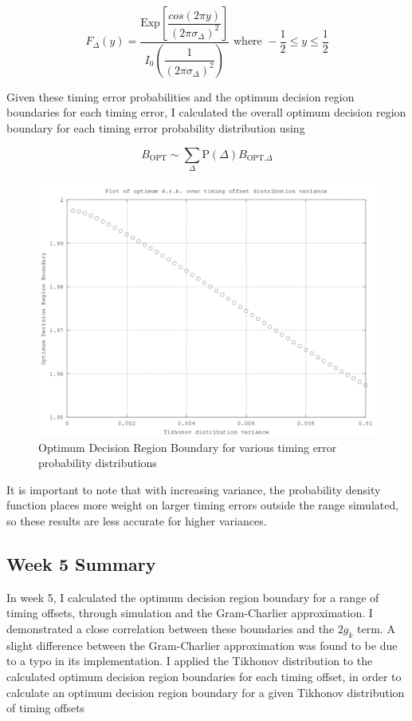 \[
F_{\Delta} (y) = \frac{\text{Exp}\left [ \dfrac{cos(2 \pi y)}{(2 \pi \sigma_{\Delta})^2} \right ]}{I_0 \left ( \dfrac{1}{(2 \pi \sigma_{\Delta})^2} \right )} \text{  where  } -\frac{1}{2} \le y \le \frac{1}{2}
\]

Given these timing error probabilities and the optimum decision region
boundaries for each timing error, I calculated the overall optimum
decision region boundary for each timing error probability distribution
using

\[
B_{\text{OPT}} \sim \sum_{\Delta} \text{P}(\Delta) B_{\text{OPT,}\Delta}
\]

\begin{figure}[htbp]
\centering
\includegraphics[width=\linewidth]{../../../plots/odrb_vs_tikhvar.png}
\caption{Optimum Decision Region Boundary for various timing error
probability distributions}
\end{figure}

It is important to note that with increasing variance, the probability
density function places more weight on larger timing errors outside the
range simulated, so these results are less accurate for higher
variances.

\subsection{Week 5 Summary}

In week 5, I calculated the optimum decision region boundary for a range
of timing offsets, through simulation and the Gram-Charlier
approximation. I demonstrated a close correlation between these
boundaries and the $2 g_k$ term. A slight difference between the
Gram-Charlier approximation was found to be due to a typo in its
implementation. I applied the Tikhonov distribution to the calculated
optimum decision region boundaries for each timing offset, in order to
calculate an optimum decision region boundary for a given Tikhonov
distribution of timing offsets

